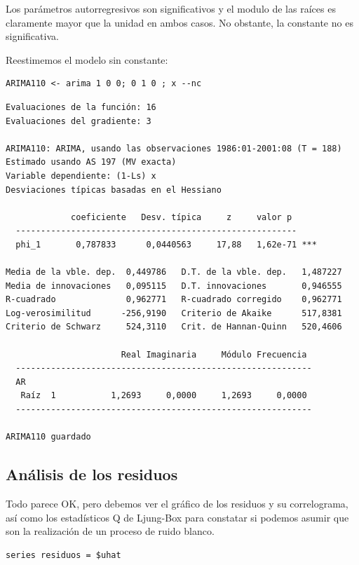 \documentclass[10pt]{article}
\begin{document}
Los parámetros autorregresivos son significativos y el modulo de las
raíces es claramente mayor que la unidad en ambos casos. No obstante,
la constante no es significativa. 

Reestimemos el modelo sin constante:

\begin{verbatim}
ARIMA110 <- arima 1 0 0; 0 1 0 ; x --nc
\end{verbatim}

\begin{verbatim}
Evaluaciones de la función: 16
Evaluaciones del gradiente: 3

ARIMA110: ARIMA, usando las observaciones 1986:01-2001:08 (T = 188)
Estimado usando AS 197 (MV exacta)
Variable dependiente: (1-Ls) x
Desviaciones típicas basadas en el Hessiano

             coeficiente   Desv. típica     z     valor p 
  --------------------------------------------------------
  phi_1       0,787833      0,0440563     17,88   1,62e-71 ***

Media de la vble. dep.  0,449786   D.T. de la vble. dep.   1,487227
Media de innovaciones   0,095115   D.T. innovaciones       0,946555
R-cuadrado              0,962771   R-cuadrado corregido    0,962771
Log-verosimilitud      -256,9190   Criterio de Akaike      517,8381
Criterio de Schwarz     524,3110   Crit. de Hannan-Quinn   520,4606

                       Real Imaginaria     Módulo Frecuencia
  -----------------------------------------------------------
  AR
   Raíz  1           1,2693     0,0000     1,2693     0,0000
  -----------------------------------------------------------

ARIMA110 guardado
\end{verbatim}
\subsection*{Análisis de los residuos}
\label{sec:org867f565}

Todo parece OK, pero debemos ver el gráfico de los residuos y su
correlograma, así como los estadísticos Q de Ljung-Box para constatar
si podemos asumir que son la realización de un proceso de ruido
blanco.

\begin{verbatim}
series residuos = $uhat
\end{verbatim}
\end{document}
